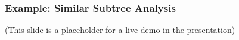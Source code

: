     

\begin{frame}
\frametitle{Example: Similar Subtree Analysis}

(This slide is a placeholder for a live demo in the presentation)

\end{frame}


